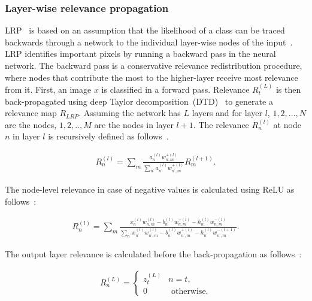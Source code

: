 \subsubsection{Layer-wise relevance propagation}
LRP~\cite{LRP1} is based on an assumption that the likelihood of a class can be traced backwards through a network to the individual layer-wise nodes of the input~\cite{LRP2}. LRP identifies important pixels by running a backward pass in the neural network. The backward pass is a conservative relevance redistribution procedure, where nodes that contribute the most to the higher-layer receive most relevance from it. First, an image $x$ is classified in a forward pass. Relevance $R_{t}^{(L)}$ is then back-propagated using deep Taylor decomposition~(DTD)~\cite{DTD} to generate a relevance map $R_{LRP}$. Assuming the network has $L$ layers and for layer $l$, $1,2,...,N$ are the nodes, $1,2,..,M$ are the nodes in layer $l+ 1$. The relevance $R_{n}^{(l)}$ at node $n$ in layer $l$ is recursively defined as follows~\cite{LRP2}.  

\vspace{-4mm}
\begin{align}
    R_{n}^{(l)}=\sum_{m} \frac{a_{n}^{(l)} w_{n, m}^{+(l)}}{\sum_{n^{\prime}} a_{n^{\prime}}^{(l)} w_{n^{\prime}, m}^{+(l)}} R_{m}^{(l+1)}.
\end{align}

The node-level relevance in case of negative values is calculated using ReLU as follows~\cite{LRP2}:

\vspace{-4mm}
\begin{align}
    R_{n}^{(l)}=\sum_{m} \frac{x_{n}^{(l)} w_{n, m}^{(l)}-b_{n}^{(l)} w_{n, m}^{+(l)}-h_{n}^{(l)} w_{n, m}^{-(l)}}{\sum_{n^{\prime}} x_{n^{\prime}}^{(l)} w_{n^{\prime}, m}^{(l)}-b_{n^{\prime}}^{(l)} w_{n^{\prime}, m}^{+(l)}-h_{n^{\prime}}^{(l)} w_{n^{\prime}, m}^{-(l+1)}}.
    \label{eq:rn_neg}
\end{align}

The output layer relevance is calculated before the back-propagation as follows~\cite{LRP2}:

\vspace{-4mm}
\begin{align}
    R_{n}^{(L)}=\left\{\begin{array}{ll}
    {z_{t}^{(L)}} & {n=t}, \\
    {0} & {\text { otherwise.}}
    \end{array}\right.
    \label{eq:rn}
\end{align}

